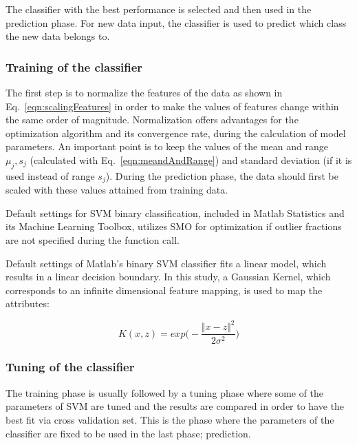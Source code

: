 The classifier with the best performance is selected and then used in the prediction phase.  
For new data input, the classifier is used to predict which class the new data belongs to.

\subsubsection{Training of the classifier}

The first step is to normalize the features of the data as shown in Eq.~\ref{eqn:scalingFeatures} in order to make the values of features change within the same order of magnitude. 
Normalization offers advantages for the optimization algorithm and its convergence rate, during the calculation of model parameters.  
An important point is to keep the values of the mean and range $\mu_j, s_j$ (calculated with Eq.~\ref{eqn:meandAndRange}) and standard deviation (if it is used instead of range $s_j$). 
During the prediction phase, the data should first be scaled with these values attained from training data.

Default settings for SVM binary classification, included in Matlab Statistics and its Machine Learning Toolbox, utilizes SMO for optimization if outlier fractions are not specified during the function call. 

Default settings of Matlab's binary SVM classifier fits a linear model, which results in a linear decision boundary.  
In this study, a Gaussian Kernel, which corresponds to an infinite dimensional feature mapping, is used to map the attributes:

\begin{equation}
K (x,z) = exp \bigg(-\frac{\Vert x - z \Vert ^ 2}{2 \sigma^2} \bigg)
\end{equation}


\subsubsection{Tuning of the classifier}

The training phase is usually followed by a tuning phase where some of the parameters of SVM are tuned and the results are compared in order to have the best fit via cross validation set. This is the phase where the parameters of the classifier are fixed to be used in the last phase; prediction.

